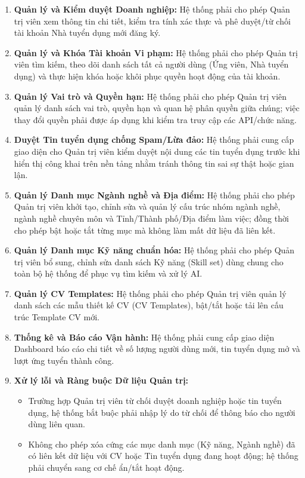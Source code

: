 \begin{enumerate}[label=\bfseries REQ-ADM-\arabic*:, leftmargin=2.5cm]
    \item \textbf{Quản lý và Kiểm duyệt Doanh nghiệp:} Hệ thống phải cho phép Quản trị viên xem thông tin chi tiết, kiểm tra tính xác thực và phê duyệt/từ chối tài khoản Nhà tuyển dụng mới đăng ký.
    \item \textbf{Quản lý và Khóa Tài khoản Vi phạm:} Hệ thống phải cho phép Quản trị viên tìm kiếm, theo dõi danh sách tất cả người dùng (Ứng viên, Nhà tuyển dụng) và thực hiện khóa hoặc khôi phục quyền hoạt động của tài khoản.
    \item \textbf{Quản lý Vai trò và Quyền hạn:} Hệ thống phải cho phép Quản trị viên quản lý danh sách vai trò, quyền hạn và quan hệ phân quyền giữa chúng; việc thay đổi quyền phải được áp dụng khi kiểm tra truy cập các API/chức năng.
    \item \textbf{Duyệt Tin tuyển dụng chống Spam/Lừa đảo:} Hệ thống phải cung cấp giao diện cho Quản trị viên kiểm duyệt nội dung các tin tuyển dụng trước khi hiển thị công khai trên nền tảng nhằm tránh thông tin sai sự thật hoặc gian lận.
    \item \textbf{Quản lý Danh mục Ngành nghề và Địa điểm:} Hệ thống phải cho phép Quản trị viên khởi tạo, chỉnh sửa và quản lý cấu trúc nhóm ngành nghề, ngành nghề chuyên môn và Tỉnh/Thành phố/Địa điểm làm việc; đồng thời cho phép bật hoặc tắt từng mục mà không làm mất dữ liệu đã liên kết.
    \item \textbf{Quản lý Danh mục Kỹ năng chuẩn hóa:} Hệ thống phải cho phép Quản trị viên bổ sung, chỉnh sửa danh sách Kỹ năng (Skill set) dùng chung cho toàn bộ hệ thống để phục vụ tìm kiếm và xử lý AI.
    \item \textbf{Quản lý CV Templates:} Hệ thống phải cho phép Quản trị viên quản lý danh sách các mẫu thiết kế CV (CV Templates), bật/tắt hoặc tải lên cấu trúc Template CV mới.
    \item \textbf{Thống kê và Báo cáo Vận hành:} Hệ thống phải cung cấp giao diện Dashboard báo cáo chi tiết về số lượng người dùng mới, tin tuyển dụng mở và lượt ứng tuyển thành công.
    \item \textbf{Xử lý lỗi và Ràng buộc Dữ liệu Quản trị:}
    \begin{itemize}
        \item Trường hợp Quản trị viên từ chối duyệt doanh nghiệp hoặc tin tuyển dụng, hệ thống bắt buộc phải nhập lý do từ chối để thông báo cho người dùng liên quan.
        \item Không cho phép xóa cứng các mục danh mục (Kỹ năng, Ngành nghề) đã có liên kết dữ liệu với CV hoặc Tin tuyển dụng đang hoạt động; hệ thống phải chuyển sang cơ chế ẩn/tắt hoạt động.
    \end{itemize}
\end{enumerate}

